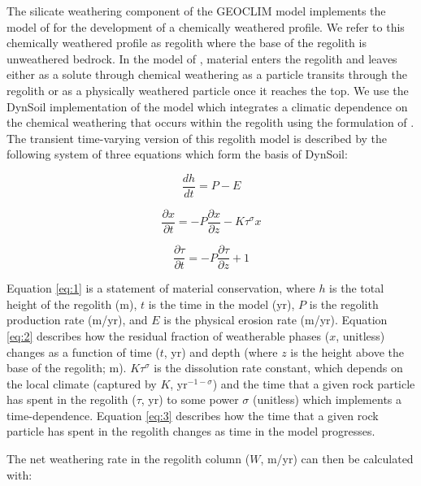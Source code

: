 \documentclass[11pt,letterpaper]{article}
\begin{document}
The silicate weathering component of the GEOCLIM model implements the model of \cite{Gabet2009a} for the development of a chemically weathered profile. We refer to this chemically weathered profile as regolith where the base of the regolith is unweathered bedrock. In the model of \citet{Gabet2009a}, material enters the regolith and leaves either as a solute through chemical weathering as a particle transits through the regolith or as a physically weathered particle once it reaches the top. We use the DynSoil implementation of the \cite{Gabet2009a} model which integrates a climatic dependence on the chemical weathering that occurs within the regolith using the formulation of \cite{West2012a}. The transient time-varying version of this regolith model is described by the following system of three equations which form the basis of DynSoil:

\begin{equation}
    \frac{dh}{dt} = P - E
    \label{eq:1}
\end{equation}

\begin{equation}
    \frac{\partial x}{\partial t} = -P \frac{\partial x}{\partial z} - K \tau^{\sigma}x
    \label{eq:2}
\end{equation}

\begin{equation}
    \frac{\partial \tau}{\partial t} = -P \frac{\partial \tau}{\partial z} + 1
    \label{eq:3}
\end{equation}

\noindent
Equation \ref{eq:1} is a statement of material conservation, where $h$ is the total height of the regolith (m), $t$ is the time in the model (yr), $P$ is the regolith production rate (m/yr), and $E$ is the physical erosion rate (m/yr). Equation \ref{eq:2} describes how the residual fraction of weatherable phases ($x$, unitless) changes as a function of time ($t$, yr) and depth (where $z$ is the height above the base of the regolith; m). $K \tau^{\sigma}$ is the dissolution rate constant, which depends on the local climate (captured by $K$, yr$^{-1-\sigma}$) and the time that a given rock particle has spent in the regolith ($\tau$, yr) to some power $\sigma$ (unitless) which implements a time-dependence. Equation \ref{eq:3} describes how the time that a given rock particle has spent in the regolith changes as time in the model progresses.

The net weathering rate in the regolith column ($W$, m/yr) can then be calculated with:
\end{document}
